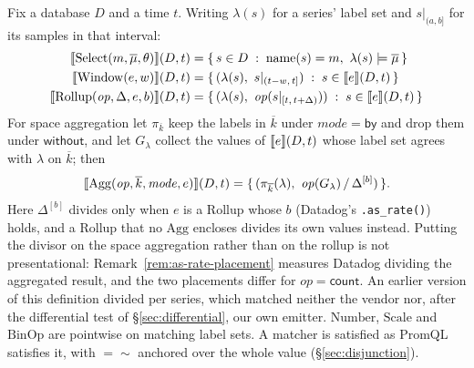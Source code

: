 \begin{definition}[Denotation]\label{def:ir-sem}
Fix a database $D$ and a time $t$. Writing $\lambda(s)$ for a series' label set and
$s|_{(a,b]}$ for its samples in that interval:
\begin{align*}
\sem{\mathrm{Select}(m,\overline{\mu},\theta)}(D,t)
  &= \{\, s\in D \;:\; \mathrm{name}(s)=m,\ \lambda(s)\models\overline{\mu} \,\}\\
\sem{\mathrm{Window}(e,w)}(D,t) &= \{\, (\lambda(s),\ s|_{(t-w,\,t]}) \;:\; s\in\sem{e}(D,t) \,\}\\
\sem{\mathrm{Rollup}(\mathit{op},\Delta,e,b)}(D,t)
  &= \{\, (\lambda(s),\ \mathit{op}(s|_{[t,\,t+\Delta)})) \;:\; s\in\sem{e}(D,t) \,\}
\end{align*}
For space aggregation let $\pi_{\overline{k}}$ keep the labels in $\overline{k}$ under
$\mathit{mode}=\mathsf{by}$ and drop them under $\mathsf{without}$, and let $G_\lambda$
collect the values of $\llbracket e \rrbracket(D,t)$ whose label set agrees with $\lambda$ on
$\overline{k}$; then
\[
\sem{\mathrm{Agg}(\mathit{op},\overline{k},\mathit{mode},e)}(D,t)
  = \{\,(\pi_{\overline{k}}(\lambda),\ \mathit{op}(G_\lambda)\,/\,\Delta^{[b]})\,\}.
\]
Here $\Delta^{[b]}$ divides only when $e$ is a $\mathrm{Rollup}$ whose $b$ (Datadog's
\texttt{.as\_rate()}) holds, and a $\mathrm{Rollup}$ that no $\mathrm{Agg}$ encloses
divides its own values instead. Putting the divisor on the space aggregation rather
than on the rollup is not presentational: Remark~\ref{rem:as-rate-placement} measures
Datadog dividing the aggregated result, and the two placements differ for
$\mathit{op}=\mathsf{count}$. An earlier version of this definition divided per series,
which matched neither the vendor nor, after the differential test of
\S\ref{sec:differential}, our own emitter.
$\mathrm{Number}$, $\mathrm{Scale}$ and
$\mathrm{BinOp}$ are pointwise on matching label sets. A matcher is satisfied as
PromQL satisfies it, with $=\!\sim$ anchored over the whole value
(\S\ref{sec:disjunction}).
\end{definition}
